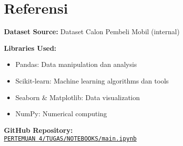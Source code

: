 \documentclass[11pt,a4paper]{article}
\begin{document}
    \section{Referensi}
    \noindent\textbf{Dataset Source:} Dataset Calon Pembeli Mobil (internal)

    \noindent\textbf{Libraries Used:}
    \begin{itemize}
        \item Pandas: Data manipulation dan analysis
        \item Scikit-learn: Machine learning algorithms dan tools
        \item Seaborn \& Matplotlib: Data visualization
        \item NumPy: Numerical computing
    \end{itemize}

    \noindent\textbf{GitHub Repository:}\\
    \href{https://github.com/sttnf/machine-learning/PERTEMUAN\%204/TUGAS/NOTEBOOKS/main.ipynb}{\texttt{PERTEMUAN 4/TUGAS/NOTEBOOKS/main.ipynb}}
\end{document}
